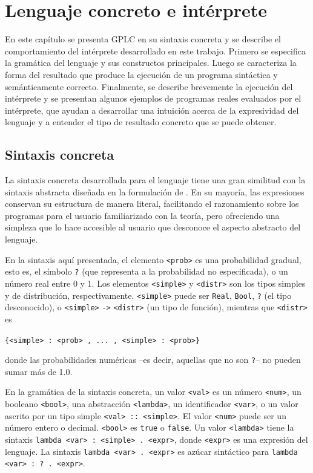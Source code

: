 \chapter{Lenguaje concreto e intérprete}

En este capítulo se presenta GPLC en su sintaxis concreta y se
describe el comportamiento del intérprete desarrollado en este
trabajo. Primero se especifica la gramática del lenguaje y sus
constructos principales. Luego se caracteriza la forma del resultado
que produce la ejecución de un programa sintáctica y semánticamente
correcto. Finalmente, se describe brevemente la ejecución del
intérprete y se presentan algunos ejemplos de programas reales
evaluados por el intérprete, que ayudan a desarrollar una intuición acerca de la
expresividad del lenguaje y a entender el tipo de resultado concreto que
se puede obtener.

\section{Sintaxis concreta}\label{sec:concreto-sintaxis}
La sintaxis concreta desarrollada para el lenguaje tiene una gran similitud con la sintaxis abstracta diseñada en la formulación de \cite{gplc}. En su mayoría, las expresiones conservan su estructura de manera literal, facilitando el razonamiento sobre los programas para el usuario familiarizado con la teoría, pero ofreciendo una simpleza que lo hace accesible al usuario que desconoce el aspecto abstracto del lenguaje.

En la sintaxis aquí presentada, el elemento \lstinline|<prob>| es una probabilidad gradual, esto es, el símbolo \lstinline|?| (que representa a la probabilidad no especificada), o un número real entre 0 y 1. Los elementos \lstinline|<simple>| y \lstinline|<distr>| son los tipos simples y de distribución, respectivamente. \lstinline|<simple>| puede ser \lstinline|Real|, \lstinline|Bool|, \lstinline|?| (el tipo desconocido), o \lstinline|<simple>| \texttt{->} \lstinline|<distr>| (un tipo de función), mientras que \lstinline|<distr>| es
\begin{center}
  \lstinline|{<simple> : <prob> , ... , <simple> : <prob>}|
\end{center}
donde las probabilidades numéricas --es decir, aquellas que no son \lstinline|?|-- no pueden sumar más de 1.0.

En la gramática de la sintaxis concreta, un valor \verb|<val>| es un número \verb|<num>|, un booleano \verb|<bool>|, una abstracción \verb|<lambda>|, un identificador \lstinline|<var>|, o un valor ascrito por un tipo simple \lstinline|<val> :: <simple>|. \;El valor \lstinline|<num>| puede ser un número entero o decimal. \lstinline|<bool>| es \lstinline|true| o \lstinline|false|. Un valor \verb|<lambda>| tiene la sintaxis \lstinline|lambda <var> : <simple> . <expr>|, donde \lstinline|<expr>| es una expresión del lenguaje. La sintaxis \lstinline|lambda <var> . <expr>| es azúcar sintáctico para \lstinline|lambda <var> : ? . <expr>|.

